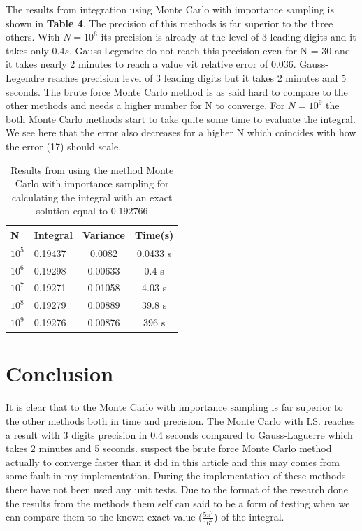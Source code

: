 \documentclass[twoside,twocolumn]{article}
\begin{document}
The results from integration using Monte Carlo with importance sampling is shown in \textbf{Table 4}. The precision of this methods is far superior to the three others. With $N = 10^6$ its precision is already at the level of 3 leading digits and it takes only $0.4 s$. Gauss-Legendre do not reach this precision even for N = 30 and it takes nearly 2 minutes to reach a value vit relative error of 0.036. Gauss-Legendre reaches precision level of 3 leading digits but it takes 2 minutes and 5 seconds. The brute force Monte Carlo method is as said hard to compare to the other methods and needs a higher number for N to converge. For $N = 10^9$ the both Monte Carlo methods start to take quite some time to evaluate the integral. We see here that the error also decreases for a higher N which coincides with how the error (17) should scale.
\begin{table}[h]
\centering
\begin{tabular}{|l|l|c|c|}
\hline
N                     & Integral & \multicolumn{1}{l|}{Variance} & Time(s)  \\ \hline
$10^5$ & 0.19437  & 0.0082                        & 0.0433 s \\ \hline
$10^6$ & 0.19298  & 0.00633                       & 0.4 s    \\ \hline
$10^7$ & 0.19271  & 0.01058                       & 4.03 s   \\ \hline
$10^8$ & 0.19279  & 0.00889                       & 39.8 s   \\ \hline
$10^9$ & 0.19276  & 0.00876                       & 396 s    \\ \hline
\end{tabular}
\caption{Results from using the method Monte Carlo with importance sampling for calculating the integral with an exact solution equal to $0.192766$}
\end{table}

\section{Conclusion}
It is clear that to the Monte Carlo with importance sampling is far superior to the other methods both in time and precision. The Monte Carlo with I.S. reaches a result with 3 digits precision in 0.4 seconds compared to Gauss-Laguerre which takes 2 minutes and 5 seconds.  suspect the brute force Monte Carlo method actually to converge faster than it did in this article and this may comes from some fault in my implementation. During the implementation of these methods there have not been used any unit tests. Due to the format of the research done the results from the methods them self can said to be a form of testing when we can compare them to the known exact value ($\frac{5\pi^2}{16^2}$) of the integral.
\end{document}

